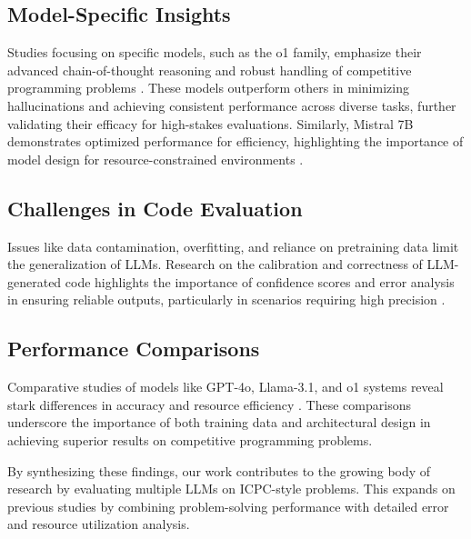 \subsection{Model-Specific Insights}
Studies focusing on specific models, such as the o1 family, emphasize their advanced chain-of-thought reasoning and robust handling of competitive programming problems \cite{b4}. These models outperform others in minimizing hallucinations and achieving consistent performance across diverse tasks, further validating their efficacy for high-stakes evaluations. Similarly, Mistral 7B demonstrates optimized performance for efficiency, highlighting the importance of model design for resource-constrained environments \cite{b11}.

\subsection{Challenges in Code Evaluation}
Issues like data contamination, overfitting, and reliance on pretraining data limit the generalization of LLMs. Research on the calibration and correctness of LLM-generated code highlights the importance of confidence scores and error analysis in ensuring reliable outputs, particularly in scenarios requiring high precision \cite{b6}.

\subsection{Performance Comparisons}
Comparative studies of models like GPT-4o, Llama-3.1, and o1 systems reveal stark differences in accuracy and resource efficiency \cite{b27,b10}. These comparisons underscore the importance of both training data and architectural design in achieving superior results on competitive programming problems.

By synthesizing these findings, our work contributes to the growing body of research by evaluating multiple LLMs on ICPC-style problems. This expands on previous studies by combining problem-solving performance with detailed error and resource utilization analysis.

